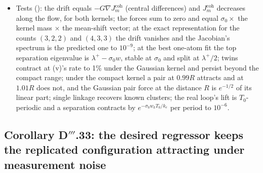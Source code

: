 \begin{itemize}
    count is not selected by the leak: it is the transit's and the schedule's.
  \item Tests (): the drift equals $-G\nabla J^{\mathrm{coh}}_m$ (central
    differences) and $J^{\mathrm{coh}}_m$ decreases along the flow, for both kernels; the forces sum to zero and equal
    $\sigma_0\times$ the kernel mass $\times$ the mean-shift vector; at the exact representation for the counts
    $(3,2,2)$ and $(4,3,3)$ the drift vanishes and the Jacobian's spectrum is the predicted one to $10^{-9}$; at the
    best one-atom fit the top separation eigenvalue is $\lambda^+-\sigma_0w$, stable at $\sigma_0$ and split at
    $\lambda^+/2$; twins contract at (v)'s rate to 1\% under the Gaussian kernel and persist beyond the compact range;
    under the compact kernel a pair at $0.99R$ attracts and at $1.01R$ does not, and the Gaussian pair force at the
    distance $R$ is $e^{-1/2}$ of its linear part; single linkage recovers known clusters; the real loop's lift is
    $T_0$-periodic and a separation contracts by $e^{-\sigma_0w_kT_0/k_e}$ per period to $10^{-6}$.
\end{itemize}

\subsection{Corollary D\texorpdfstring{$'''$}{'''}.33: the desired regressor keeps the replicated configuration
attracting under measurement noise}

